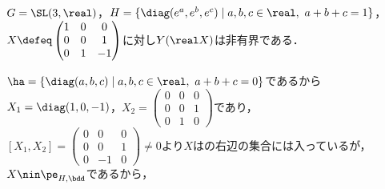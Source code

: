 \begin{prop}
  $G = \SL(3,\real) $，$H = \{\diag(e^a,e^b,e^c)\mid a,b,c\in \real,\ a+ b + c = 1 \} $，$X\defeq
  \begin{pmatrix}
    1 & 0 & 0 \\
    0 & 0 & 1 \\
    0 & 1 & -1
  \end{pmatrix}
  $に対し$Y(\real X) $は非有界である．
\end{prop}


$\ha = \{\diag(a,b,c)\mid a,b,c\in \real,\ a +b + c = 0 \}  $であるから$X_1 = \diag(1,0,-1)$，$X_2 = \begin{pmatrix}
    0 & 0 & 0 \\
    0 & 0 & 1 \\
    0 & 1 & 0
  \end{pmatrix}$であり，$[X_1, X_2] = \begin{pmatrix}
    0 & 0 & 0 \\
    0 & 0 & 1 \\
    0 & -1 & 0
  \end{pmatrix} \neq 0$より$X$はの右辺の集合には入っているが，$X\nin \pe_{H,\bdd} $であるから，